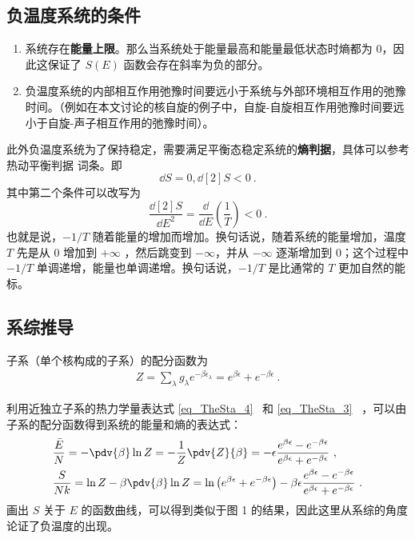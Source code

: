 \subsection{负温度系统的条件}
\begin{enumerate}
\item 系统存在\textbf{能量上限}。那么当系统处于能量最高和能量最低状态时熵都为 $0$，因此这保证了 $S(E)$ 函数会存在斜率为负的部分。
\item 负温度系统的内部相互作用弛豫时间要远小于系统与外部环境相互作用的弛豫时间。（例如在本文讨论的核自旋的例子中，自旋-自旋相互作用弛豫时间要远小于自旋-声子相互作用的弛豫时间）。
\end{enumerate}
此外负温度系统为了保持稳定，需要满足平衡态稳定系统的\textbf{熵判据}，具体可以参考热动平衡判据 词条。即
\begin{equation}
\dd S=0,\dd[2]{S}<0~.
\end{equation}
其中第二个条件可以改写为
\begin{equation}
\frac{\dd[2]{S}}{\dd E^2}=\frac{\dd }{\dd E}\left(\frac{1}{T}\right)<0~.
\end{equation}
也就是说，$-1/T$ 随着能量的增加而增加。换句话说，随着系统的能量增加，温度 $T$ 先是从 $0$ 增加到 $+\infty$ ，然后跳变到 $-\infty$，并从 $-\infty$ 逐渐增加到 $0$；这个过程中 $-1/T$ 单调递增，能量也单调递增。换句话说，$-1/T$ 是比通常的 $T$ 更加自然的能标。
\subsection{系综推导}
子系（单个核构成的子系）的配分函数为
\begin{equation}
\begin{aligned}
Z=\sum_{\lambda}g_\lambda e^{-\beta \epsilon_\lambda}=e^{\beta \epsilon } +e^{-\beta \epsilon}~.
\end{aligned}
\end{equation}

利用近独立子系的热力学量表达式 \autoref{eq_TheSta_4}~ 和 \autoref{eq_TheSta_3}~ ，可以由子系的配分函数得到系统的能量和熵的表达式：
\begin{equation}
\begin{aligned}
&\frac{\bar E}{N}=-\pdv{\beta} \ln Z=-\frac{1}{Z}\pdv{Z}{\beta}
=-\epsilon\frac{e^{\beta\epsilon}-e^{-\beta\epsilon}}{e^{\beta\epsilon}+e^{-\beta\epsilon}}~,\\
&\frac{S}{Nk}
=\ln Z-\beta\pdv{\beta} \ln Z=
\ln \left(e^{\beta\epsilon}+e^{-\beta\epsilon}\right)-
\beta\epsilon \frac{e^{\beta\epsilon}-e^{-\beta\epsilon}}{e^{\beta\epsilon}+e^{-\beta\epsilon}}~.
\end{aligned}
\end{equation}
画出 $S$ 关于 $E$ 的函数曲线，可以得到类似于图 1 的结果，因此这里从系综的角度论证了负温度的出现。